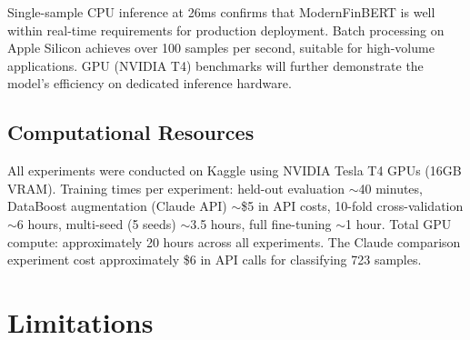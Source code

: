\documentclass[11pt]{article}
\begin{document}
Single-sample CPU inference at 26ms confirms that ModernFinBERT is well within real-time requirements for production deployment. Batch processing on Apple Silicon achieves over 100 samples per second, suitable for high-volume applications. GPU (NVIDIA T4) benchmarks will further demonstrate the model's efficiency on dedicated inference hardware.

\subsection{Computational Resources}
\label{sec:compute}

All experiments were conducted on Kaggle using NVIDIA Tesla T4 GPUs (16GB VRAM). Training times per experiment: held-out evaluation $\sim$40 minutes, DataBoost augmentation (Claude API) $\sim$\$5 in API costs, 10-fold cross-validation $\sim$6 hours, multi-seed (5 seeds) $\sim$3.5 hours, full fine-tuning $\sim$1 hour. Total GPU compute: approximately 20 hours across all experiments. The Claude comparison experiment cost approximately \$6 in API calls for classifying 723 samples.

\section{Limitations}
\label{sec:limitations}
\end{document}
